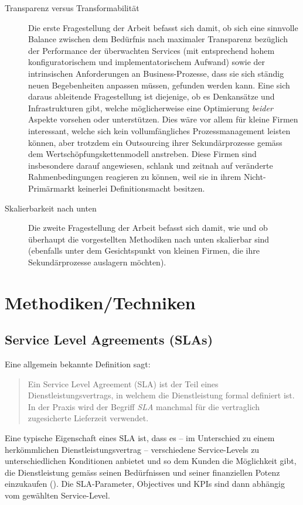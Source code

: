 \documentclass[11pt,listof=totoc]{scrreprt} %
\theoremstyle{definition}
\begin{document}
\begin{description}
\item[Transparenz versus Transformabilität]
Die erste Fragestellung der Arbeit befasst sich damit, ob sich eine sinnvolle Balance zwischen dem Bedürfnis nach maximaler Transparenz bezüglich der Performance der überwachten Services (mit entsprechend hohem konfiguratorischem und implementatorischem Aufwand) sowie der intrinsischen Anforderungen an Business-Prozesse, dass sie sich ständig neuen Begebenheiten anpassen müssen, gefunden werden kann. Eine sich daraus ableitende Fragestellung ist diejenige, ob es Denkansätze und Infrastrukturen gibt, welche möglicherweise eine Optimierung {\em beider} Aspekte vorsehen oder unterstützen. Dies wäre vor allem für kleine Firmen interessant, welche sich kein vollumfängliches Prozessmanagement leisten können, aber trotzdem ein Outsourcing ihrer Sekundärprozesse gemäss dem Wertschöpfungskettenmodell \cite{Finkeissen200001} anstreben. Diese Firmen sind insbesondere darauf angewiesen, schlank und zeitnah auf veränderte Rahmenbedingungen reagieren zu können, weil sie in ihrem Nicht-Primärmarkt keinerlei Definitionsmacht besitzen.
\item[Skalierbarkeit nach unten] Die zweite Fragestellung der Arbeit befasst sich damit, wie und ob überhaupt die vorgestellten Methodiken nach unten skalierbar sind (ebenfalls unter dem Gesichtspunkt von kleinen Firmen, die ihre Sekundärprozesse auslagern möchten).
\end{description}

\chapter{Methodiken/Techniken}
\label{methodiken}

\section{Service Level Agreements (SLAs)}
Eine allgemein bekannte Definition sagt:
\begin{quote}
Ein Service Level Agreement (SLA) ist der Teil eines Dienstleistungsvertrags, in welchem die Dienstleistung formal definiert ist. In der Praxis wird der Begriff {\em SLA} manchmal für die vertraglich zugesicherte Lieferzeit verwendet. \cite{wiki:sla}
\end{quote}

Eine typische Eigenschaft eines SLA ist, dass es -- im Unterschied zu einem herkömmlichen Dienstleistungsvertrag -- verschiedene Service-Levels zu unterschiedlichen Konditionen anbietet und so dem Kunden die Möglichkeit gibt, die Dienstleistung gemäss seinen Bedürfnissen und seiner finanziellen Potenz einzukaufen (\cite{EllisKauferstein200311}). Die SLA-Parameter, Objectives und KPIs sind dann abhängig vom gewählten Service-Level.
\end{document}
